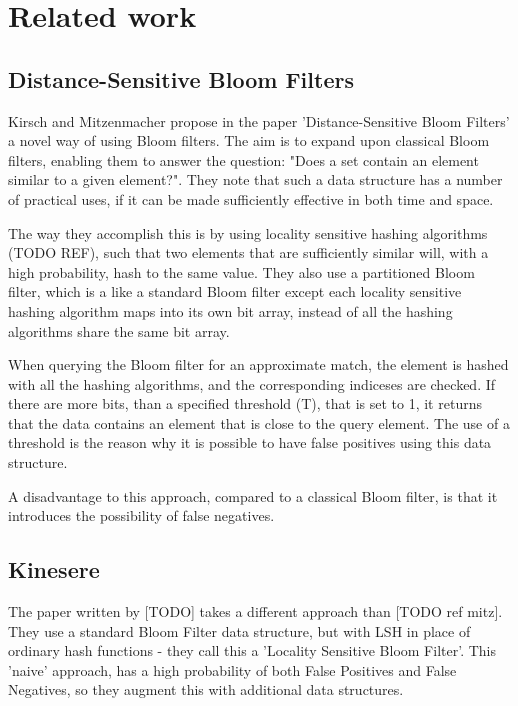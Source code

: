 \documentclass[a4paper,11pt]{article}
\begin{document}



\section{Related work} %

\subsection{Distance-Sensitive Bloom Filters}
Kirsch and Mitzenmacher propose in the paper 'Distance-Sensitive Bloom Filters'\cite{paper:harvard} a novel way of using Bloom filters. The aim is to expand upon classical Bloom filters, enabling them to answer the question: "Does a set contain an element similar to a given element?". They note that such a data structure has a number of practical uses, if it can be made sufficiently effective in both time and space.

The way they accomplish this is by using locality sensitive hashing algorithms (TODO REF), such that two elements that are sufficiently similar will, with a high probability, hash to the same value. They also use a partitioned Bloom filter, which is a like a standard Bloom filter except each locality sensitive hashing algorithm maps into its own bit array, instead of all the hashing algorithms share the same bit array.

When querying the Bloom filter for an approximate match, the element is hashed with all the hashing algorithms, and the corresponding indiceses are checked. If there are more bits, than a specified threshold (T), that is set to 1, it returns that the data contains an element that is close to the query element. The use of a threshold is the reason why it is possible to have false positives using this data structure.

A disadvantage to this approach, compared to a classical Bloom filter, is that it introduces the possibility of false negatives.





\subsection{Kinesere}
The paper written by [TODO] takes a different approach than [TODO ref mitz]. They use a standard Bloom Filter data structure, but with LSH in place of ordinary hash functions - they call this a 'Locality Sensitive Bloom Filter'. This 'naive' approach, has a high probability of both False Positives and False Negatives, so they augment this with additional data structures.
\end{document}
